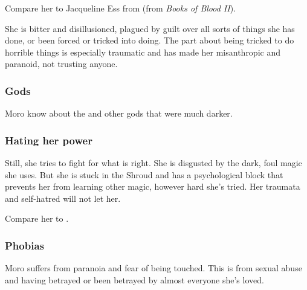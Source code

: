 Compare her to Jacqueline Ess from  (from \emph{Books of Blood II}). 

She is bitter and disillusioned, plagued by guilt over all sorts of things she has done, or been forced or tricked into doing. The part about being tricked to do horrible things is especially traumatic and has made her misanthropic and paranoid, not trusting anyone. 





\subsubsection{Gods}
Moro know about the \taorthae and other gods that were much darker.






\subsubsection{Hating her power}
Still, she tries to fight for what is right. She is disgusted by the dark, foul magic she uses. But she is stuck in the Shroud and has a psychological block that prevents her from learning other magic, however hard she's tried. Her traumata and self-hatred will not let her. 

Compare her to \SailorNothing. 





\subsubsection{Phobias}
Moro suffers from paranoia and fear of being touched. This is from sexual abuse and having betrayed or been betrayed by almost everyone she's loved. 

